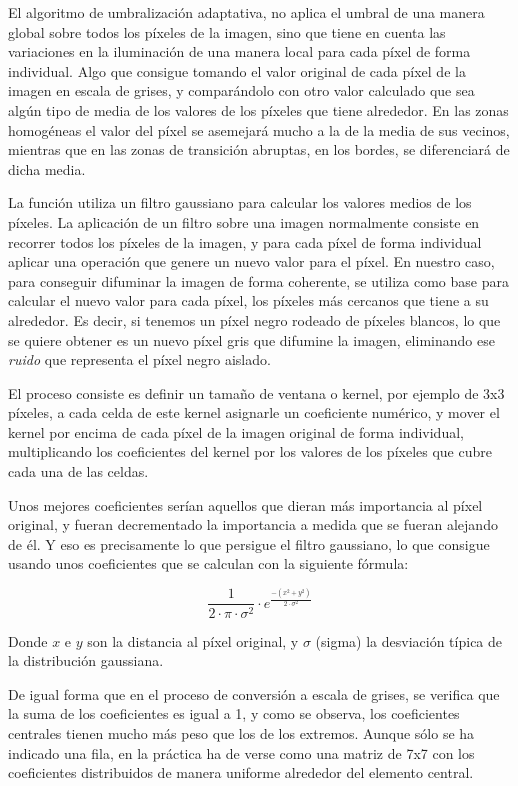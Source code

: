 El algoritmo de umbralización adaptativa, no aplica el umbral de una manera global sobre todos los píxeles de la imagen, sino que tiene en cuenta las variaciones en la iluminación de una manera local para cada píxel de forma individual. Algo que consigue tomando el valor original de cada píxel de la imagen en escala de grises, y comparándolo con otro valor calculado que sea algún tipo de media de los valores de los píxeles que tiene alrededor. En las zonas homogéneas el valor del píxel se asemejará mucho a la de la media de sus vecinos, mientras que en las zonas de transición abruptas, en los bordes, se diferenciará de dicha media.

La función utiliza un filtro gaussiano para calcular los valores medios de los píxeles. La aplicación de un filtro sobre una imagen normalmente consiste en recorrer todos los píxeles de la imagen, y para cada píxel de forma individual aplicar una operación que genere un nuevo valor para el píxel. En nuestro caso, para conseguir difuminar la imagen de forma coherente, se utiliza como base para calcular el nuevo valor para cada píxel, los píxeles más cercanos que tiene a su alrededor. Es decir, si tenemos un píxel negro rodeado de píxeles blancos, lo que se quiere obtener es un nuevo píxel gris que difumine la imagen, eliminando ese \textit{ruido} que representa el píxel negro aislado.

El proceso consiste es definir un tamaño de ventana o kernel, por ejemplo de 3x3 píxeles, a cada celda de este kernel asignarle un coeficiente numérico, y mover el kernel por encima de cada píxel de la imagen original de forma individual, multiplicando los coeficientes del kernel por los valores de los píxeles que cubre cada una de las celdas.

Unos mejores coeficientes serían aquellos que dieran más importancia al píxel original, y fueran decrementado la importancia a medida que se fueran alejando de él. Y eso es precisamente lo que persigue el filtro gaussiano, lo que consigue usando unos coeficientes que se calculan con la siguiente fórmula:

\begin{equation}
  \frac{1}{2 \cdot \pi \cdot \sigma^{2}} \cdot e^{\frac{-(x^2 + y^2)}{2 \cdot \sigma^{2}}}
\end{equation}

Donde $x$ e $y$ son la distancia al píxel original, y $\sigma$ (sigma) la desviación típica de la distribución gaussiana. 

De igual forma que en el proceso de conversión a escala de grises, se verifica que la suma de los coeficientes es igual a 1, y como se observa, los coeficientes centrales tienen mucho más peso que los de los extremos. Aunque sólo se ha indicado una fila, en la práctica ha de verse como una matriz de 7x7 con los coeficientes distribuidos de manera uniforme alrededor del elemento central. 

